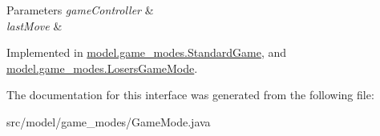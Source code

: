 \begin{DoxyParams}{Parameters}
{\em game\-Controller} & \\
\hline
{\em last\-Move} & \\
\hline
\end{DoxyParams}


Implemented in \hyperlink{classmodel_1_1game__modes_1_1_standard_game_ac71e444bda1320574ddf4be97724dbb6}{model.\-game\-\_\-modes.\-Standard\-Game}, and \hyperlink{classmodel_1_1game__modes_1_1_losers_game_mode_a489421b50008405e83cde4655e378b81}{model.\-game\-\_\-modes.\-Losers\-Game\-Mode}.



The documentation for this interface was generated from the following file\-:\begin{DoxyCompactItemize}
\item 
src/model/game\-\_\-modes/Game\-Mode.\-java\end{DoxyCompactItemize}
